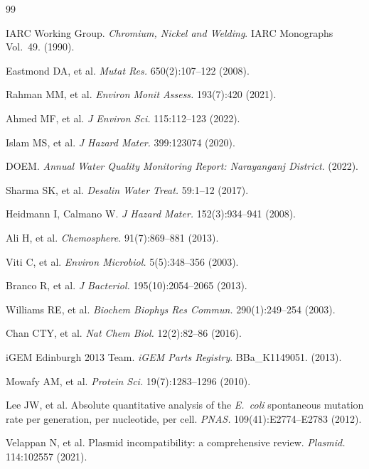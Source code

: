 \documentclass[10pt,twocolumn,letterpaper,
              colorlinks=true,
              linkcolor=blue!70!black,
              citecolor=blue!70!black,
              urlcolor=blue!70!black,
              pdfborder={0 0 0}]{article}
\begin{document}
\begin{thebibliography}{99}

IARC Working Group. \textit{Chromium, Nickel and Welding}.
IARC Monographs Vol.~49. (1990).

Eastmond DA, et al. \textit{Mutat Res.} 650(2):107--122 (2008).

Rahman MM, et al. \textit{Environ Monit Assess.} 193(7):420 (2021).

Ahmed MF, et al. \textit{J Environ Sci.} 115:112--123 (2022).

Islam MS, et al. \textit{J Hazard Mater.} 399:123074 (2020).

DOEM. \textit{Annual Water Quality Monitoring Report: Narayanganj
District}. (2022).

Sharma SK, et al. \textit{Desalin Water Treat.} 59:1--12 (2017).

Heidmann I, Calmano W. \textit{J Hazard Mater.} 152(3):934--941
(2008).

Ali H, et al. \textit{Chemosphere.} 91(7):869--881 (2013).

Viti C, et al. \textit{Environ Microbiol.} 5(5):348--356 (2003).

Branco R, et al. \textit{J Bacteriol.} 195(10):2054--2065 (2013).

Williams RE, et al. \textit{Biochem Biophys Res Commun.}
290(1):249--254 (2003).

Chan CTY, et al. \textit{Nat Chem Biol.} 12(2):82--86 (2016).

iGEM Edinburgh 2013 Team. \textit{iGEM Parts Registry}. BBa\_K1149051.
(2013).

Mowafy AM, et al. \textit{Protein Sci.} 19(7):1283--1296 (2010).

Lee JW, et al. Absolute quantitative analysis of the \textit{E.~coli}
spontaneous mutation rate per generation, per nucleotide, per cell.
\textit{PNAS.} 109(41):E2774--E2783 (2012).

Velappan N, et al. Plasmid incompatibility: a comprehensive review.
\textit{Plasmid.} 114:102557 (2021).


\end{thebibliography}
\end{document}
